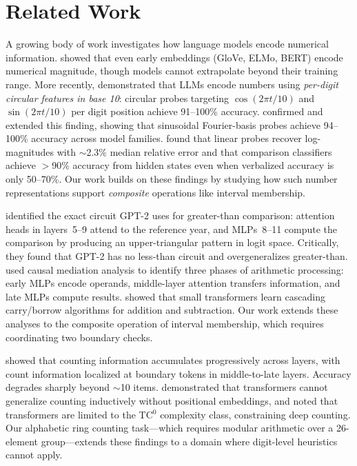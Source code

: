 \section{Related Work}
\label{sec:related_work}

A growing body of work investigates how language models encode numerical information. \citet{wallace2019nlp} showed that even early embeddings (GloVe, ELMo, BERT) encode numerical magnitude, though models cannot extrapolate beyond their training range. More recently, \citet{levy2024language} demonstrated that LLMs encode numbers using \emph{per-digit circular features in base 10}: circular probes targeting $\cos(2\pi t / 10)$ and $\sin(2\pi t / 10)$ per digit position achieve 91--100\% accuracy. \citet{kadlcik2025pretrained} confirmed and extended this finding, showing that sinusoidal Fourier-basis probes achieve 94--100\% accuracy across model families. \citet{yuchi2026llms} found that linear probes recover log-magnitudes with $\sim$2.3\% median relative error and that comparison classifiers achieve $>$90\% accuracy from hidden states even when verbalized accuracy is only 50--70\%. Our work builds on these findings by studying how such number representations support \emph{composite} operations like interval membership.

\citet{hanna2023how} identified the exact circuit GPT-2 uses for greater-than comparison: attention heads in layers~5--9 attend to the reference year, and MLPs~8--11 compute the comparison by producing an upper-triangular pattern in logit space. Critically, they found that GPT-2 has no less-than circuit and overgeneralizes greater-than. \citet{stolfo2023mechanistic} used causal mediation analysis to identify three phases of arithmetic processing: early MLPs encode operands, middle-layer attention transfers information, and late MLPs compute results. \citet{quirke2024understanding} showed that small transformers learn cascading carry/borrow algorithms for addition and subtraction. Our work extends these analyses to the composite operation of interval membership, which requires coordinating two boundary checks.

\citet{hasani2026mechanistic} showed that counting information accumulates progressively across layers, with count information localized at boundary tokens in middle-to-late layers. Accuracy degrades sharply beyond $\sim$10 items. \citet{chang2024language} demonstrated that transformers cannot generalize counting inductively without positional embeddings, and \citet{zhang2024transformers} noted that transformers are limited to the TC$^0$ complexity class, constraining deep counting. Our alphabetic ring counting task---which requires modular arithmetic over a 26-element group---extends these findings to a domain where digit-level heuristics cannot apply.

